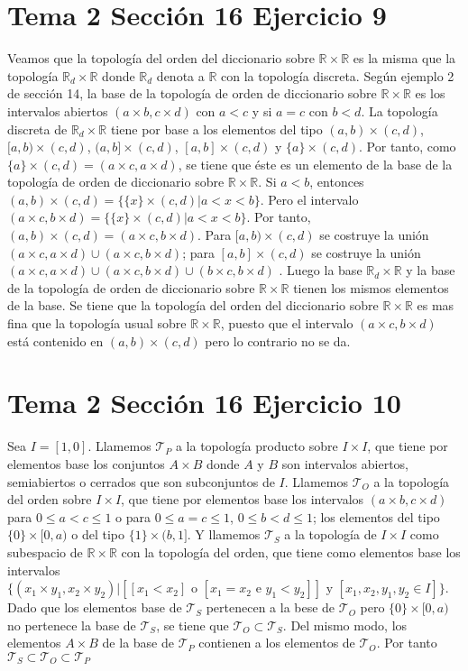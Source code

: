 \documentclass{article}
\begin{document}
\section{Tema 2 Sección 16 Ejercicio 9}
Veamos que la topología del orden del diccionario sobre $\mathbb{R}\times\mathbb{R}$ es la misma que la topología $\mathbb{R}_d\times\mathbb{R}$ donde $\mathbb{R}_d$ denota a $\mathbb{R}$ con la topología discreta. Según ejemplo 2 de sección 14, la base de la topología de orden de diccionario sobre $\mathbb{R}\times\mathbb{R}$ es los intervalos abiertos $(a\times b,c\times d)$ con $a<c$ y si $a=c$ con $b<d$. La topología discreta de $\mathbb{R}_d\times\mathbb{R}$ tiene por base a los elementos del tipo $(a,b)\times(c,d)$,  $[a,b)\times(c,d)$, $(a,b]\times(c,d)$,  $[a,b]\times(c,d)$ y $\{a\}\times (c,d)$. Por tanto, como $\{a\}\times (c,d)=(a\times c, a\times d)$, se tiene que éste es un elemento de la base de la topología de orden de diccionario sobre $\mathbb{R}\times\mathbb{R}$. Si $a<b$, entonces $(a,b)\times(c,d)=\{\{x\}\times (c,d)|a<x<b\}$. Pero el intervalo $(a\times c,b\times d)= \{\{x\}\times (c,d)|a<x<b\}$. Por tanto, $(a,b)\times (c,d)=(a\times c,b\times d)$. Para $[a,b)\times(c,d)$ se costruye la unión  $(a\times c, a\times d)\cup (a\times c, b\times d)$; para $[a,b]\times(c,d)$ se costruye la unión  $(a\times c, a\times d)\cup (a\times c, b\times d)\cup (b\times c, b\times d)$ . Luego la base $\mathbb{R}_d\times\mathbb{R}$ y la base de la topología de orden de diccionario sobre $\mathbb{R}\times\mathbb{R}$ tienen los mismos elementos de la base. Se tiene que la topología del orden del diccionario sobre $\mathbb{R}\times\mathbb{R}$ es mas fina que la topología usual sobre $\mathbb{R}\times\mathbb{R}$, puesto que el intervalo $(a\times c, b\times d)$ está contenido en $(a,b)\times (c,d)$ pero lo contrario no se da.

\section{Tema 2 Sección 16 Ejercicio 10}
Sea $I=[1,0]$. Llamemos $\mathcal{T}_P$ a la topología producto sobre $I\times I$, que tiene por elementos base los conjuntos $A\times B$ donde $A$ y $B$ son intervalos abiertos, semiabiertos o cerrados que son subconjuntos de $I$. Llamemos $\mathcal{T}_O$ a la topología del orden sobre $I\times I$, que tiene por elementos base los intervalos $(a\times b, c\times d)$ para $0\leq a<c\leq 1$ o para $0\leq a=c\leq 1$, $0\leq b<d\leq 1$; los elementos del tipo $\{0\}\times [0,a)$ o del tipo $\{1\}\times (b,1]$. Y llamemos $\mathcal{T}_S$ a la topología de $I\times I$ como subespacio de $\mathbb{R}\times \mathbb{R}$ con la topología del orden, que tiene como elementos base los intervalos  $\{(x_1\times y_1, x_2\times y_2)| [[x_1<x_2] \text{ o } [x_1=x_2\text{ e } y_1<y_2]] \text{ y }[x_1,x_2,y_1,y_2\in I]\}$. Dado que los elementos base de $\mathcal{T}_S$ pertenecen a la bese de $\mathcal{T}_O$ pero $\{0\}\times [0,a)$ no pertenece  la base de $\mathcal{T}_S$, se tiene que $\mathcal{T}_O\subset \mathcal{T}_S$. Del mismo modo, los elementos $A\times B$ de la base de $\mathcal{T}_P$ contienen a los elementos de $\mathcal{T}_O$. Por tanto $\mathcal{T}_S\subset\mathcal{T}_O\subset\mathcal{T}_P$
\end{document}

